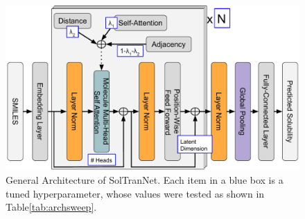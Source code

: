 \documentclass[journal=jmcmar,manuscript=article]{achemso}
\begin{document}
\begin{figure}[tb]
    \centering
    \includegraphics[width=\linewidth]{figures/soltrannet_architecture.pdf}
    \caption{General Architecture of SolTranNet. Each item in a blue box is a tuned hyperparameter, whose values were tested as shown in Table\ref{tab:archsweep}.}
    \label{fig:architecture}
\end{figure}
\end{document}
